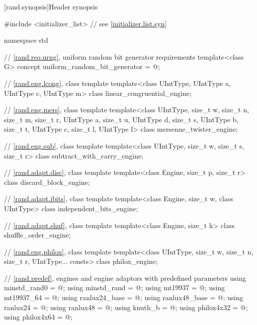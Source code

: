 

[rand.synopsis]{Header  synopsis}


\begin{codeblock}
#include <initializer_list>     // see \ref{initializer.list.syn}

namespace std {
  // \ref{rand.req.urng}, uniform random bit generator requirements
  template<class G>
    concept uniform_random_bit_generator = @\seebelow@;

  // \ref{rand.eng.lcong}, class template 
  template<class UIntType, UIntType a, UIntType c, UIntType m>
    class linear_congruential_engine;

  // \ref{rand.eng.mers}, class template 
  template<class UIntType, size_t w, size_t n, size_t m, size_t r,
           UIntType a, size_t u, UIntType d, size_t s,
           UIntType b, size_t t,
           UIntType c, size_t l, UIntType f>
    class mersenne_twister_engine;

  // \ref{rand.eng.sub}, class template 
  template<class UIntType, size_t w, size_t s, size_t r>
    class subtract_with_carry_engine;

  // \ref{rand.adapt.disc}, class template 
  template<class Engine, size_t p, size_t r>
    class discard_block_engine;

  // \ref{rand.adapt.ibits}, class template 
  template<class Engine, size_t w, class UIntType>
    class independent_bits_engine;

  // \ref{rand.adapt.shuf}, class template 
  template<class Engine, size_t k>
    class shuffle_order_engine;

  // \ref{rand.eng.philox}, class template 
  template<class UIntType, size_t w, size_t n, size_t r, UIntType... consts>
    class philox_engine;

  // \ref{rand.predef}, engines and engine adaptors with predefined parameters
  using minstd_rand0  = @\seebelow@;
  using minstd_rand   = @\seebelow@;
  using mt19937       = @\seebelow@;
  using mt19937_64    = @\seebelow@;
  using ranlux24_base = @\seebelow@;
  using ranlux48_base = @\seebelow@;
  using ranlux24      = @\seebelow@;
  using ranlux48      = @\seebelow@;
  using knuth_b       = @\seebelow@;
  using philox4x32    = @\seebelow@;
  using philox4x64    = @\seebelow@;

}
\end{codeblock}
